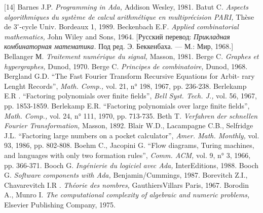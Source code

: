 \documentclass{../../template/mai_book}
\begin{document}
[14] Barnes J.P. {\itshape Programming in Ada,} Addison Wesley, 1981. \newline
[15] Batut C. {\itshape Aspects algorithmiques du syst\`{e}me de calcul arithm\'{e}tique en multipr\'{e}cision PARI,} Th\`{e}se de $3^{\circ}$-cycle Univ. Bordeaux 1, 1989. \newline
\newpage
\noindent
[16] Beckenbach  E.F. {\itshape Applied combinatorial mathematics,} John Wiley and Sons, 1964. [Русский перевод: {\itshape Прикладная комбинаторная математика.} Под ред. Э. Беккенбаха. — М.: Мир, 1968.] \newline 
[17] Bellanger М. {\itshape Traitement num\'{e}rique du signal,} Masson, 1981. \newline
[18] Berge C. {\itshape Graphes et hypergraphes,} Dunod, 1970. \newline 
[19] Berge C. {\itshape Principes de combinatoire,} Dunod, 1968.  \newline 
[20] Bergland G.D. “The Fast Fourier Transform Recursive Equations for Arbit- \newline rary Lenght Records”, {\itshape Math. Comp.,} vol. 21, n° 198, 1967, pp. 236-238. \newline 
[21] Berlekamp E.R . “Factoring polynomials over finite fields”, {\itshape Bell Syst. Tech. J.,} vol. 56, 1967, pp. 1853-1859. \newline 
[22] Berlekamp E.R. “Factoring polynomials over large finite fields”, {\itshape Math. Comp.,} vol. 24, n° 111, 1970, pp. 713-735. \newline 
[23] Beth T. {\itshape Verfahren der schnellen Fourier Transformation,} Masson, 1892.  \newline
[24] Blair W.D., Lacampagne C.B., Selfridge J.L. “Factoring large
numbers on a pocket calculator”, {\itshape Amer. Math. Monthly,} vol. 93, 1986, pp. 802-808. \newline
[25] Boehm C., Jacopini G. “Flow diagrams, Turing machines, and languages
with only two formation rules”, {\itshape Comm. ACM,} vol. 9, n° 3, 1966,
pp. 366-371. \newline
[26] Booch G. {\itshape Ing\'{e}nierie du logiciel avec Ada,} InterEditions, 1988. \newline 
[27] Booch G. {\itshape Software components with Ada,} Benjamin/Cummings, 1987. \newline
[28] Borevitch Z.I., Chavarevitch I.R . {\itshape Th\'{e}orie des nombres,} GauthiersVillars Paris, 1967. \newline
[29] Borodin A., Munro I. {\itshape The computational complexity of algebraic and numeric problems,} Elsevier Publishing Company, 1975. \newline
\end{document}
